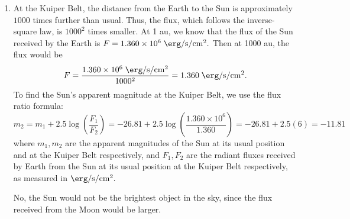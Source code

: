\documentclass[11pt,letterpaper]{article}
\begin{document}
\begin{enumerate}[label=(\alph*)]
		\item
		At the Kuiper Belt, the distance from the Earth to the Sun is approximately $1000$ times further than usual. Thus, the flux, which follows the inverse-square law, is $1000^2$ times smaller. At 1 au, we know that the flux of the Sun received by the Earth is $F=1.360\times 10^6\;\si{\erg\per\second\per\square\cm}.$ Then at 1000 au, the flux would be $$F=\frac{1.360\times 10^6\;\si{\erg\per\second\per\square\cm}}{1000^2} = 1.360\;\si{\erg\per\second\per\square\cm}.$$ To find the Sun's apparent magnitude at the Kuiper Belt, we use the flux ratio formula: $$m_2 = m_1 + 2.5\log(\frac{F_1}{F_2}) = -26.81 + 2.5\log(\frac{1.360\times 10^6}{1.360}) = -26.81+2.5(6) = -11.81$$ where $m_1, m_2$ are the apparent magnitudes of the Sun at its usual position and at the Kuiper Belt respectively, and $F_1, F_2$ are the radiant fluxes received by Earth from the Sun at its usual position at the Kuiper Belt respectively, as measured in $\si{\erg\per\second\per\square\cm}.$
		
		No, the Sun would not be the brightest object in the sky, since the flux received from the Moon would be larger. 
		
	\end{enumerate}
	
\end{document}
